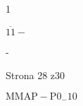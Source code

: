 \documentclass[a4paper,12pt]{article}
\begin{document}
1

$\overline{11}-$

-

Strona 28 z30

$\mathrm{M}\mathrm{M}\mathrm{A}\mathrm{P}-\mathrm{P}0_{-}10$
\end{document}
